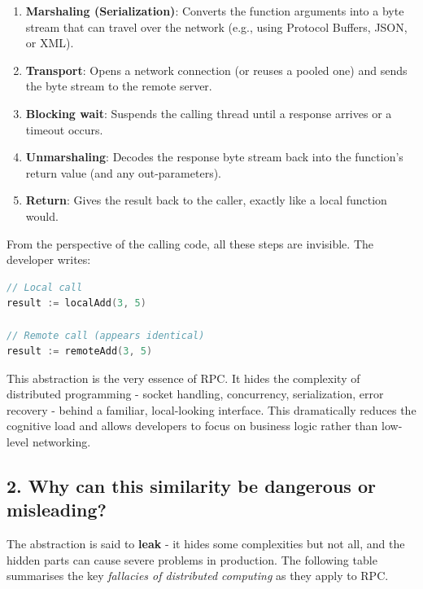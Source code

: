 \documentclass[10pt,a4paper]{article}
\begin{document}
\begin{enumerate}
    \item \textbf{Marshaling (Serialization)}: Converts the function arguments into a byte stream that can travel over the network (e.g., using Protocol Buffers, JSON, or XML).
    \item \textbf{Transport}: Opens a network connection (or reuses a pooled one) and sends the byte stream to the remote server.
    \item \textbf{Blocking wait}: Suspends the calling thread until a response arrives or a timeout occurs.
    \item \textbf{Unmarshaling}: Decodes the response byte stream back into the function’s return value (and any out-parameters).
    \item \textbf{Return}: Gives the result back to the caller, exactly like a local function would.
\end{enumerate}

From the perspective of the calling code, all these steps are invisible. The developer writes:

\begin{lstlisting}[language=Go]
// Local call
result := localAdd(3, 5)

// Remote call (appears identical)
result := remoteAdd(3, 5)
\end{lstlisting}

This abstraction is the very essence of RPC. It hides the complexity of distributed programming - socket handling, concurrency, serialization, error recovery - behind a familiar, local-looking interface. This dramatically reduces the cognitive load and allows developers to focus on business logic rather than low-level networking.

\subsection{2. Why can this similarity be dangerous or misleading?}

The abstraction is said to \textbf{leak} - it hides some complexities but not all, and the hidden parts can cause severe problems in production. The following table summarises the key \textit{fallacies of distributed computing} as they apply to RPC.
\end{document}

